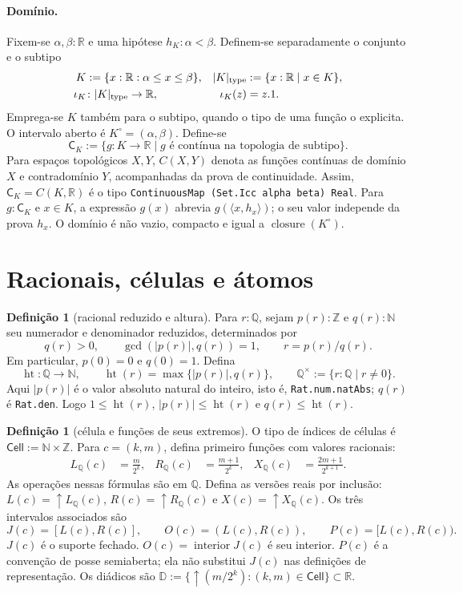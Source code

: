 \documentclass[12pt,a4paper]{article}
\theoremstyle{preciso}
\theoremstyle{definition}
\newtheorem{definicao}[teorema]{Definição}
\newcommand{\N}{\mathbb N}
\newcommand{\Z}{\mathbb Z}
\newcommand{\Q}{\mathbb Q}
\newcommand{\R}{\mathbb R}
\newcommand{\D}{\mathbb D}
\newcommand{\Cell}{\mathsf{Cell}}
\newcommand{\CK}{\mathsf C_K}
\newcommand{\htq}{\operatorname{ht}}
\newcommand{\qstar}{\Q^{\times}}
\newcommand{\cls}{\operatorname{closure}}
\newcommand{\intr}{\operatorname{interior}}
\newcommand{\code}[1]{\nolinkurl{#1}}
\theoremstyle{preciso}
\theoremstyle{preciso}
\theoremstyle{preciso}
\theoremstyle{preciso}
\theoremstyle{definition}
\theoremstyle{preciso}
\theoremstyle{definition}
\theoremstyle{preciso}
\theoremstyle{preciso}
\theoremstyle{definition}
\begin{document}
\paragraph{Domínio.}
Fixem-se $\alpha,\beta:\R$ e uma hipótese $h_K:\alpha<\beta$.
Definem-se separadamente o conjunto e o subtipo
\begin{align*}
 K &:= \{x:\R:\alpha\le x\le\beta\}, &
 |K|_{\rm type} &:= \{x:\R\mid x\in K\},\\
 \iota_K &\colon |K|_{\rm type}\to\R, &
 \iota_K(z) &= z.1.
\end{align*}
Emprega-se $K$ também para o subtipo, quando o tipo de uma função o explicita.
O intervalo aberto é $K^\circ=(\alpha,\beta)$.
Define-se
\[
 \CK:=\{g:K\to\R\mid g\text{ é contínua na topologia de subtipo}\}.
\]
Para espaços topológicos $X,Y$, $C(X,Y)$ denota as funções contínuas
de domínio $X$ e contradomínio $Y$, acompanhadas da prova de continuidade.
Assim, $\CK=C(K,\R)$ é o tipo
\code{ContinuousMap (Set.Icc alpha beta) Real}. Para $g:\CK$ e $x\in K$, a expressão $g(x)$ abrevia
$g(\langle x,h_x\rangle)$; o seu valor independe da prova $h_x$.
O domínio é não vazio, compacto e igual a $\cls(K^\circ)$.

\section{Racionais, células e átomos}
\label{normalizacao:sec:objects}

\begin{definicao}[racional reduzido e altura]\label{map:normalizacao:2.1}
Para $r:\Q$, sejam $p(r):\Z$ e $q(r):\N$ seu numerador e denominador
reduzidos, determinados por
\[
 q(r)>0,\qquad \gcd(|p(r)|,q(r))=1,\qquad r=p(r)/q(r).
\]
Em particular, $p(0)=0$ e $q(0)=1$. Defina
\[
 \htq:\Q\to\N,\qquad \htq(r)=\max\{|p(r)|,q(r)\},\qquad
 \qstar:=\{r:\Q\mid r\ne0\}.
\]
Aqui $|p(r)|$ é o valor absoluto natural do inteiro, isto é,
\code{Rat.num.natAbs}; $q(r)$ é \code{Rat.den}. Logo
$1\le\htq(r)$, $|p(r)|\le\htq(r)$ e $q(r)\le\htq(r)$.
\end{definicao}

\begin{definicao}[célula e funções de seus extremos]\label{map:normalizacao:2.2}
O tipo de índices de células é $\Cell:=\N\times\Z$. Para $c=(k,m)$,
defina primeiro funções com valores racionais:
\begin{align*}
 L_\Q(c)&=\frac{m}{2^k},&
 R_\Q(c)&=\frac{m+1}{2^k},&
 X_\Q(c)&=\frac{2m+1}{2^{k+1}}.
\end{align*}
As operações nessas fórmulas são em $\Q$. Defina as versões reais por
inclusão: $L(c)=\uparrow L_\Q(c)$, $R(c)=\uparrow R_\Q(c)$ e
$X(c)=\uparrow X_\Q(c)$. Os três intervalos associados são
\[
 J(c)=[L(c),R(c)],\qquad O(c)=(L(c),R(c)),\qquad
 P(c)=[L(c),R(c)).
\]
$J(c)$ é o suporte fechado. $O(c)=\intr J(c)$ é seu interior.
$P(c)$ é a convenção de posse semiaberta; ela não substitui $J(c)$
nas definições de representação.
Os diádicos são
$\D:=\{\uparrow(m/2^k):(k,m)\in\Cell\}\subset\R$.
\end{definicao}
\end{document}
